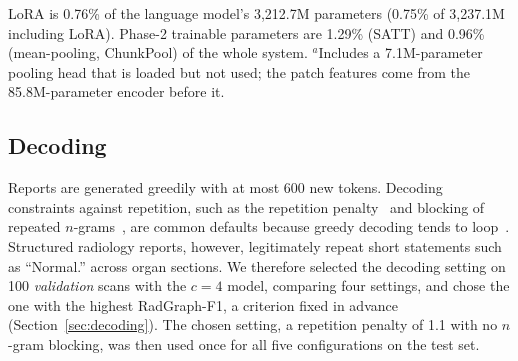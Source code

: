 \documentclass[conference]{IEEEtran}
\begin{document}
\begin{table}[t]
\centering
\caption{Parameter counts. Frozen components are identical in all
configurations.}
\label{tab:params}
\footnotesize
\setlength{\tabcolsep}{4pt}

\vspace{2pt}
\parbox{\columnwidth}{\scriptsize LoRA is 0.76\% of the language model's
3,212.7M parameters (0.75\% of 3,237.1M including LoRA). Phase-2 trainable
parameters are 1.29\% (SATT) and 0.96\% (mean-pooling, ChunkPool) of the whole system.
$^{a}$Includes a 7.1M-parameter pooling head that is loaded but not used; the
patch features come from the 85.8M-parameter encoder before it.}
\end{table}

\subsection{Decoding}
Reports are generated greedily with at most 600 new tokens. Decoding
constraints against repetition, such as the repetition
penalty~\cite{ctrl} and blocking of repeated $n$-grams~\cite{paulus2018}, are
common defaults because greedy decoding tends to loop~\cite{holtzman2020}.
Structured radiology reports, however, legitimately repeat short statements
such as ``Normal.'' across organ sections. We therefore selected the decoding
setting on 100 \emph{validation} scans with the $c=4$ model, comparing four
settings, and chose the one with the highest RadGraph-F1, a criterion fixed
in advance (Section~\ref{sec:decoding}). The chosen setting, a repetition
penalty of 1.1 with no $n$-gram blocking, was then used once for all five
configurations on the test set.
\end{document}
